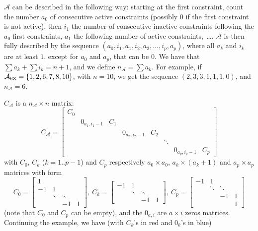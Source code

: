 \documentclass[]{article}
\newcommand{\BIN}{\begin{bmatrix}}
\newcommand{\BOUT}{\end{bmatrix}}
\begin{document}
$\mathcal{A}$ can be described in the following way: starting at the first constraint, count the number $a_0$ of consecutive active constraints (possibly $0$ if the first constraint is not active), then $i_1$ the number of consecutive inactive constraints following the $a_0$ first constraints, $a_1$ the following number of active constraints,~\ldots. $\mathcal{A}$ is then fully described by the sequence $(a_0, i_1, a_1, i_2, a_2, \ldots, i_p, a_p)$, where all $a_k$ and $i_k$ are at least $1$, except for $a_0$ and $a_p$, that can be $0$. We have that $\sum a_k + \sum i_k = n+1$, and we define $n_{\mathcal{A}} = \sum a_k$.
For example, if $\mathcal{A}_{\mbox{\small ex}} = \left\{1, 2, 6, 7, 8, 10\right\}$, with $n=10$, we get the sequence $(2,3,3,1,1,1,0)$, and $n_{\mathcal{A}} = 6$.

$C_\mathcal{A}$ is a $n_{\mathcal{A}}\times n$ matrix:
\begin{equation}
  C_\mathcal{A} = 
  \BIN C_0 &     &     &     &     &        &     &    \\
           & 0_{a_1, i_1-1} & C_1 &     &     &        &     &    \\
           &     &     & 0_{a_2, i_2-1} & C_2 &        &     &    \\
           &     &     &     &     & \ddots &     &    \\
           &     &     &     &     &        & 0_{a_p, i_p-1} & C_p\BOUT
\end{equation}
with $C_0$, $C_k$ ($k=1..p-1$) and $C_p$ respectively $a_0\times a_0$, $a_k\times (a_k+1)$ and $a_p\times a_p$ matrices with form
\begin{equation}
  C_0 = \BIN 1 &        &        &   \\
            -1 &    1   &        &   \\
               & \ddots & \ddots &   \\
               &        &   -1   & 1 \BOUT, \
  C_k = \BIN-1 &    1   &        &   \\
               & \ddots & \ddots &   \\
               &        &   -1   & 1 \BOUT, \
  C_p = \BIN-1 &    1    &        &   \\
               & \ddots  & \ddots &   \\
               &         &   -1   & 1 \\
               &         &        & 1 \BOUT \nonumber
\end{equation}
(note that $C_0$ and $C_p$ can be empty), and the $0_{a,i}$ are $a\times i$ zeros matrices. Continuing the example, we have (with $C_k$'s in red and $0_k$'s in blue)
\end{document}
